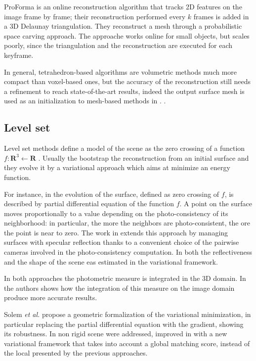 ProForma \cite{Pan_et_al09} is an online reconstruction algorithm that tracks 2D features on the image frame by frame; their reconstruction performed every $k$ frames is added in a 3D Delaunay triangulation. They reconstruct a mesh through a probabilistic space carving approach. The approache works online for small objects, but scales poorly, since the triangulation and the reconstruction are executed for each keyframe.

In general, tetrahedron-based algorithms are volumetric methods  much more compact than voxel-based ones, but the accuracy of the reconstruction still needs a refinement to reach state-of-the-art results, indeed the output surface mesh is used as an initialization to mesh-based methods in \cite{vu_et_al_2012,hiep2009towards,salman2010surface}.
.
\subsection{Level set}
Level set methods define a model of the scene as the zero crossing of a function $f:\mathbf{R}^3\leftarrow\mathbf{R}$ \cite{faugeras2002variational,jin2002variational,yezzi2003stereoscopic,fuhrmann2014floating,solem2005geometric,yoon2010joint,pons2007multi}. 
Usually the bootstrap the reconstruction from an initial surface and they evolve it by a variational approach which aims at minimize an energy function.

For instance, in \cite{faugeras2002variational} the evolution of the surface, defined as zero crossing of $f$, is described by partial differential equation of the function $f$. A point on the surface moves proportionally to a value depending on the photo-consistency of its neighborhood: in particular, the more the neighbors are photo-consistent, the ore the point is near to zero.
The work in \cite{jin2002variational} extends this approach by managing surfaces with specular reflection thanks to a convenient choice of the pairwise cameras involved in the photo-consistency computation. In \cite{yoon2010joint} both the reflectiveness and the shape of the scene eas estimated in the variational framework.

In both approaches the photometric measure is integrated in the 3D domain. In \cite{yezzi2003stereoscopic} the authors shows how the integration of this measure on the image domain produce more accurate results.

Solem \emph{et al.} \cite{solem2005geometric} propose a geometric formalization of the variational minimization, in particular replacing the partial differential equation with the gradient, showing its robustness.
In \cite{pons2005modelling} non rigid scene were addressed, improved in \cite{pons2007multi}  with a new variational framework that takes into account a global matching score, instead of the local presented by the previous approaches.

